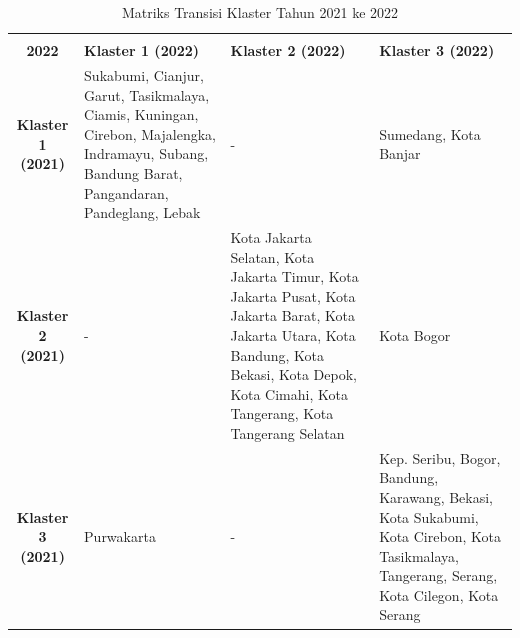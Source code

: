 \begin{table}[H]
\centering
\caption{Matriks Transisi Klaster Tahun 2021 ke 2022} \label{tab:transisi_2021_2022}
\begin{tabular}{|c|p{2cm}|p{2cm}|p{2cm}|}
\hline
\makecell{\textbf{Tahun 2021} \\ \textbf{2022}} & \textbf{Klaster 1 (2022)} & \textbf{Klaster 2 (2022)} & \textbf{Klaster 3 (2022)} \\ \hline
\textbf{Klaster 1 (2021)} & Sukabumi, Cianjur, Garut, Tasikmalaya, Ciamis, Kuningan, Cirebon, Majalengka, Indramayu, Subang, Bandung Barat, Pangandaran, Pandeglang, Lebak & - & Sumedang, Kota Banjar \\ \hline
\textbf{Klaster 2 (2021)} & - & Kota Jakarta Selatan, Kota Jakarta Timur, Kota Jakarta Pusat, Kota Jakarta Barat, Kota Jakarta Utara, Kota Bandung, Kota Bekasi, Kota Depok, Kota Cimahi, Kota Tangerang, Kota Tangerang Selatan & Kota Bogor \\ \hline
\textbf{Klaster 3 (2021)} & Purwakarta & - & Kep. Seribu, Bogor, Bandung, Karawang, Bekasi, Kota Sukabumi, Kota Cirebon, Kota Tasikmalaya, Tangerang, Serang, Kota Cilegon, Kota Serang \\ \hline
\end{tabular}
\end{table}